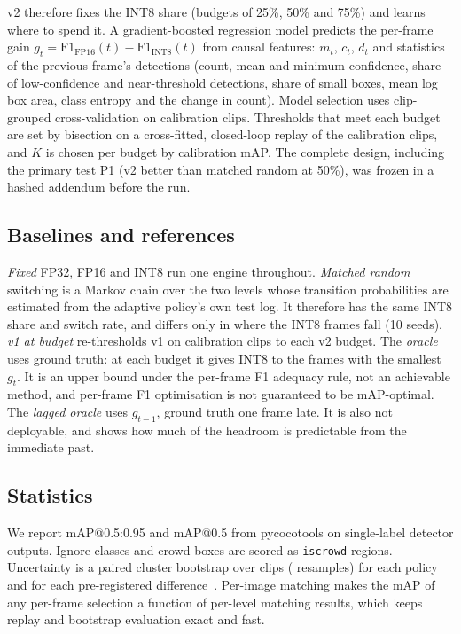 \documentclass[pdflatex,sn-mathphys-num]{sn-jnl}
\begin{document}
v2 therefore fixes the INT8 share (budgets of 25\%, 50\% and 75\%) and learns where to spend it. A gradient-boosted regression model predicts the per-frame gain $g_t = \mathrm{F1}_{\text{FP16}}(t) - \mathrm{F1}_{\text{INT8}}(t)$ from causal features: $m_t$, $c_t$, $d_t$ and statistics of the previous frame's detections (count, mean and minimum confidence, share of low-confidence and near-threshold detections, share of small boxes, mean log box area, class entropy and the change in count). Model selection uses clip-grouped cross-validation on calibration clips. Thresholds that meet each budget are set by bisection on a cross-fitted, closed-loop replay of the calibration clips, and $K$ is chosen per budget by calibration mAP. The complete design, including the primary test P1 (v2 better than matched random at 50\%), was frozen in a hashed addendum before the run.

\subsection{Baselines and references}
\emph{Fixed} FP32, FP16 and INT8 run one engine throughout. \emph{Matched random} switching is a Markov chain over the two levels whose transition probabilities are estimated from the adaptive policy's own test log. It therefore has the same INT8 share and switch rate, and differs only in where the INT8 frames fall (10 seeds). \emph{v1 at budget} re-thresholds v1 on calibration clips to each v2 budget. The \emph{oracle} uses ground truth: at each budget it gives INT8 to the frames with the smallest $g_t$. It is an upper bound under the per-frame F1 adequacy rule, not an achievable method, and per-frame F1 optimisation is not guaranteed to be mAP-optimal. The \emph{lagged oracle} uses $g_{t-1}$, ground truth one frame late. It is also not deployable, and shows how much of the headroom is predictable from the immediate past.

\subsection{Statistics}
We report mAP@0.5:0.95 and mAP@0.5 from pycocotools on single-label detector outputs. Ignore classes and crowd boxes are scored as \texttt{iscrowd} regions. Uncertainty is a paired cluster bootstrap over clips (\BootResamples{} resamples) for each policy and for each pre-registered difference~\cite{efron1994bootstrap,cameron2008bootstrap}. Per-image matching makes the mAP of any per-frame selection a function of per-level matching results, which keeps replay and bootstrap evaluation exact and fast.
\end{document}
